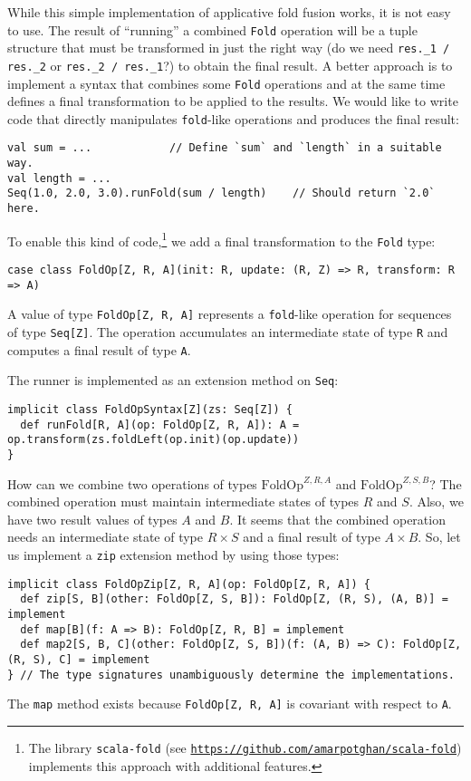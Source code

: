 While this simple implementation of applicative fold fusion works,
it is not easy to use. The result of \textsf{``}running\textsf{''} a combined \lstinline!Fold!
operation will be a tuple structure that must be transformed in just
the right way (do we need \lstinline!res._1 / res._2! or \lstinline!res._2 / res._1!?)
to obtain the final result. A better approach is to implement a syntax
that combines some \lstinline!Fold! operations and at the same time
defines a final transformation to be applied to the results. We would
like to write code that directly manipulates \lstinline!fold!-like
operations and produces the final result:
\begin{lstlisting}
val sum = ...            // Define `sum` and `length` in a suitable way.
val length = ...
Seq(1.0, 2.0, 3.0).runFold(sum / length)    // Should return `2.0` here.
\end{lstlisting}

To enable this kind of code,\footnote{The library \texttt{scala-fold} (see \texttt{\href{https://github.com/amarpotghan/scala-fold}{https://github.com/amarpotghan/scala-fold}})
implements this approach with additional features.} we add a final transformation to the \lstinline!Fold! type:
\begin{lstlisting}
case class FoldOp[Z, R, A](init: R, update: (R, Z) => R, transform: R => A)
\end{lstlisting}
A value of type \lstinline!FoldOp[Z, R, A]! represents a \lstinline!fold!-like
operation for sequences of type \lstinline!Seq[Z]!. The operation
accumulates an intermediate state of type \lstinline!R! and computes
a final result of type \lstinline!A!.

The runner is implemented as an extension method on \lstinline!Seq!:
\begin{lstlisting}
implicit class FoldOpSyntax[Z](zs: Seq[Z]) {
  def runFold[R, A](op: FoldOp[Z, R, A]): A = op.transform(zs.foldLeft(op.init)(op.update))
}
\end{lstlisting}

How can we combine two  operations of types $\text{FoldOp}^{Z,R,A}$
and $\text{FoldOp}^{Z,S,B}$? The combined operation must maintain
intermediate states of types $R$ and $S$. Also, we have two result
values of types $A$ and $B$. It seems that the combined operation
needs an intermediate state of type $R\times S$ and a final result
of type $A\times B$. So, let us implement a \lstinline!zip! extension
method by using those types:
\begin{lstlisting}
implicit class FoldOpZip[Z, R, A](op: FoldOp[Z, R, A]) {
  def zip[S, B](other: FoldOp[Z, S, B]): FoldOp[Z, (R, S), (A, B)] = implement
  def map[B](f: A => B): FoldOp[Z, R, B] = implement
  def map2[S, B, C](other: FoldOp[Z, S, B])(f: (A, B) => C): FoldOp[Z, (R, S), C] = implement
} // The type signatures unambiguously determine the implementations.
\end{lstlisting}
The \lstinline!map! method exists because \lstinline!FoldOp[Z, R, A]!
is covariant with respect to \lstinline!A!.

